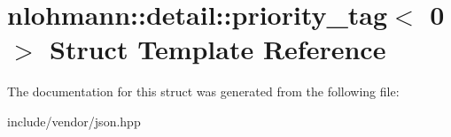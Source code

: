\hypertarget{structnlohmann_1_1detail_1_1priority__tag_3_010_01_4}{}\section{nlohmann\+:\+:detail\+:\+:priority\+\_\+tag$<$ 0 $>$ Struct Template Reference}
\label{structnlohmann_1_1detail_1_1priority__tag_3_010_01_4}


The documentation for this struct was generated from the following file\+:\begin{DoxyCompactItemize}
\item 
include/vendor/json.\+hpp\end{DoxyCompactItemize}
